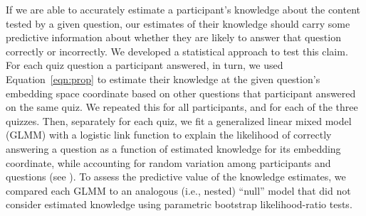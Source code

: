 \documentclass[10pt]{article}
\renewcommand{\nameref}[1]{\mbox{\textit{\oldnameref{#1}}}}
\begin{document}
If we are able to accurately estimate a participant's knowledge about the
content tested by a given question, our estimates of their knowledge should
carry some predictive information about whether they are likely to answer that
question correctly or incorrectly. We developed a statistical approach to test
this claim. For each quiz question a participant answered, in turn, we used
Equation~\ref{eqn:prop} to estimate their knowledge at the given question's
embedding space coordinate based on other questions that participant answered
on the same quiz. We repeated this for all participants, and for each of the
three quizzes. Then, separately for each quiz, we fit a generalized linear
mixed model (GLMM) with a logistic link function to explain the likelihood of
correctly answering a question as a function of estimated knowledge for its
embedding coordinate, while accounting for random variation among participants
and questions (see \nameref{subsec:glmm}). To assess the predictive value of
the knowledge estimates, we compared each GLMM to an analogous (i.e., nested)
``null'' model that did not consider estimated knowledge using parametric
bootstrap likelihood-ratio tests.
\end{document}
